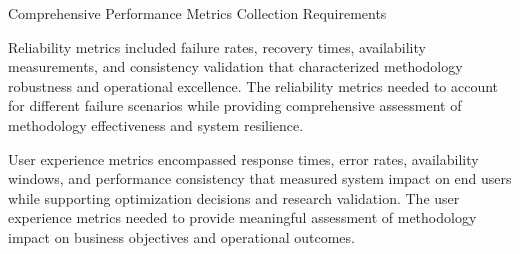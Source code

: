 \begin{table}[H]
\centering
\caption{Comprehensive Performance Metrics Collection Requirements}
\label{tab:performance-metrics-collection}
\end{table}

Reliability metrics included failure rates, recovery times, availability measurements, and consistency validation that characterized methodology robustness and operational excellence. The reliability metrics needed to account for different failure scenarios while providing comprehensive assessment of methodology effectiveness and system resilience.

User experience metrics encompassed response times, error rates, availability windows, and performance consistency that measured system impact on end users while supporting optimization decisions and research validation. The user experience metrics needed to provide meaningful assessment of methodology impact on business objectives and operational outcomes.